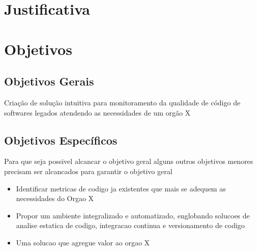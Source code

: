 \section{Justificativa}

	

	\section{Objetivos}

	\subsection{Objetivos Gerais} %
	\label{sub:objetivos_gerais}
	
		Criação de solução intuitiva para monitoramento da qualidade de código de softwares legados atendendo as necessidades de um orgão X


	\subsection{Objetivos Específicos} %
	\label{sub:objetivos_específicos}

	Para que seja possivel alcancar o objetivo geral alguns outros objetivos menores precisam ser alcancados para garantir  o objetivo geral 
		 
	\begin{itemize}
		\item Identificar metricas de codigo ja existentes que mais se adequem as necessidades do Orgao X
		\item Propor um ambiente integralizado e automatizado, englobando solucoes de analise estatica de codigo, integracao continua e versionamento de codigo
		\item Uma solucao que agregue valor ao orgao X
	\end{itemize}
	
